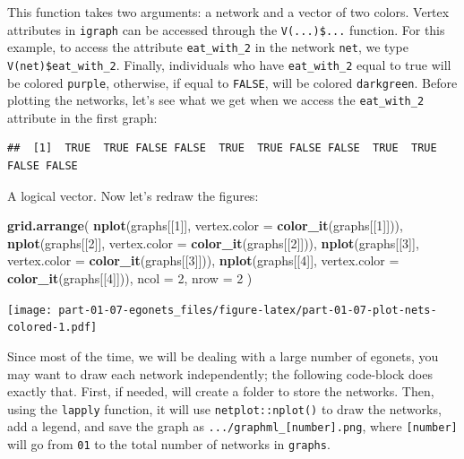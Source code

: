 \documentclass[
]{book}
\newenvironment{Shaded}{\begin{snugshade}}{\end{snugshade}}
\newcommand{\AttributeTok}[1]{\textcolor[rgb]{0.13,0.29,0.53}{#1}}
\newcommand{\DecValTok}[1]{\textcolor[rgb]{0.00,0.00,0.81}{#1}}
\newcommand{\FunctionTok}[1]{\textcolor[rgb]{0.13,0.29,0.53}{\textbf{#1}}}
\newcommand{\NormalTok}[1]{#1}
\newcommand{\SpecialCharTok}[1]{\textcolor[rgb]{0.81,0.36,0.00}{\textbf{#1}}}
\begin{document}
This function takes two arguments: a network and a vector of two colors. Vertex attributes in \texttt{igraph} can be accessed through the \texttt{V(...)\$...} function. For this example, to access the attribute \texttt{eat\_with\_2} in the network \texttt{net}, we type \texttt{V(net)\$eat\_with\_2}. Finally, individuals who have \texttt{eat\_with\_2} equal to true will be colored \texttt{purple}, otherwise, if equal to \texttt{FALSE}, will be colored \texttt{darkgreen}. Before plotting the networks, let's see what we get when we access the \texttt{eat\_with\_2} attribute in the first graph:

\begin{Shaded}
\end{Shaded}

\begin{verbatim}
##  [1]  TRUE  TRUE FALSE FALSE  TRUE  TRUE FALSE FALSE  TRUE  TRUE FALSE FALSE
\end{verbatim}

A logical vector. Now let's redraw the figures:

\begin{Shaded}
\begin{Highlighting}[]
\FunctionTok{grid.arrange}\NormalTok{(}
  \FunctionTok{nplot}\NormalTok{(graphs[[}\DecValTok{1}\NormalTok{]], }\AttributeTok{vertex.color =} \FunctionTok{color\_it}\NormalTok{(graphs[[}\DecValTok{1}\NormalTok{]])),}
  \FunctionTok{nplot}\NormalTok{(graphs[[}\DecValTok{2}\NormalTok{]], }\AttributeTok{vertex.color =} \FunctionTok{color\_it}\NormalTok{(graphs[[}\DecValTok{2}\NormalTok{]])),}
  \FunctionTok{nplot}\NormalTok{(graphs[[}\DecValTok{3}\NormalTok{]], }\AttributeTok{vertex.color =} \FunctionTok{color\_it}\NormalTok{(graphs[[}\DecValTok{3}\NormalTok{]])),}
  \FunctionTok{nplot}\NormalTok{(graphs[[}\DecValTok{4}\NormalTok{]], }\AttributeTok{vertex.color =} \FunctionTok{color\_it}\NormalTok{(graphs[[}\DecValTok{4}\NormalTok{]])),}
  \AttributeTok{ncol =} \DecValTok{2}\NormalTok{, }\AttributeTok{nrow =} \DecValTok{2}
\NormalTok{)}
\end{Highlighting}
\end{Shaded}

\texttt{[image: part-01-07-egonets\_files/figure-latex/part-01-07-plot-nets-colored-1.pdf]}

Since most of the time, we will be dealing with a large number of egonets, you may want to draw each network independently; the following code-block does exactly that. First, if needed, will create a folder to store the networks. Then, using the \texttt{lapply} function, it will use \texttt{netplot::nplot()} to draw the networks, add a legend, and save the graph as \texttt{.../graphml\_{[}number{]}.png}, where \texttt{{[}number{]}} will go from \texttt{01} to the total number of networks in \texttt{graphs}.
\end{document}
